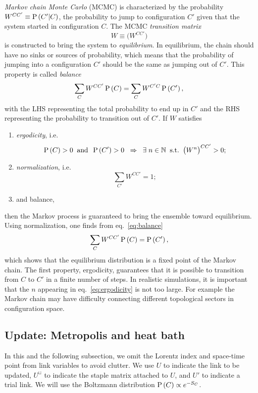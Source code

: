 {\it Markov chain Monte Carlo} (MCMC) is characterized by the probability 
$W^{CC'}\equiv\operatorname{P}\left(C'|C\right)$, the probability to jump to configuration 
$C'$ given that the system started in configuration $C$.
The MCMC {\it transition matrix}
\begin{equation}
  W\equiv\Big(W^{CC'}\Big)
\end{equation}
is constructed to bring the system to {\it equilibrium}.
In equilibrium, the chain should have no sinks or sources of probability,
which means that the probability of jumping into a configuration $C'$
should be the same as jumping out of $C'$. This property
is called {\it balance}
\begin{equation}\label{eq:balance}
    \sum\limits_CW^{CC'}\operatorname{P}\left(C\right)=
    \sum\limits_CW^{C'C}\operatorname{P}\left(C'\right),
\end{equation}
with the LHS representing the total probability to end up in $C'$ and
the RHS representing the probability to transition out of $C'$.
If $W$ satisfies
\begin{enumerate}
  \item {\it ergodicity}, i.e.
        \begin{equation}\label{eq:ergodicity}
          \operatorname{P}\left(C\right)>0\;\;\text{and}\;\;\operatorname{P}\left(C'\right)>0\;\;\Rightarrow\;\;
          \exists\;n\in\mathbb{N}\;\;\text{s.t.}\;\;\big(W^n\big)^{CC'}>0;
        \end{equation}
  \item {\it normalization}, i.e.
        \begin{equation}
          \sum\limits_{C'}W^{CC'}=1;
        \end{equation}
  \item and balance, 
\end{enumerate}
then the Markov process is guaranteed to bring the ensemble toward 
equilibrium. Using normalization, one finds from eq.~\eqref{eq:balance}
\begin{equation}\index{balance}
    \sum\limits_CW^{CC'}\pr{C}=\pr{C'},
\end{equation}
which shows that the equilibrium distribution is a fixed point of
the Markov chain. The first property, ergodicity, guarantees that it
is possible to transition from $C$ to $C'$ in a finite number of steps.
In realistic simulations, it is important that the $n$ appearing in
eq.~\eqref{eq:ergodicity} is not too large. For example 
the Markov chain may have difficulty connecting different topological sectors
in configuration space.

\subsection{Update: Metropolis and heat bath}
In this and the following subsection,
we omit the Lorentz index and space-time point from link variables to
avoid clutter.  We use $U$ to indicate the link to be updated, 
$U^\sqcup$ to indicate the staple matrix attached to $U$, and
$U'$ to indicate a trial link. We will use the Boltzmann
distribution $\operatorname{P}\left(C\right)\propto e^{-S_C}$.

